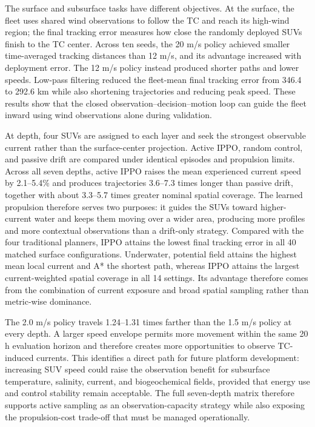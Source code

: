 \documentclass[a4paper,fleqn]{cas-dc}
\begin{document}
The surface and subsurface tasks have different objectives. At the surface, the
fleet uses shared wind observations to follow the TC and reach its high-wind
region; the final tracking error measures how close the randomly deployed SUVs
finish to the TC center. Across ten seeds, the 20 m/s policy achieved smaller
time-averaged tracking distances than 12 m/s, and its advantage increased with
deployment error. The 12 m/s
policy instead produced shorter paths and lower speeds. Low-pass filtering
reduced the fleet-mean final tracking error from 346.4 to 292.6 km while also
shortening trajectories and reducing peak speed. These results show that the
closed observation--decision--motion loop can guide the fleet inward using wind
observations alone during validation.

At depth, four SUVs are assigned to each layer and seek the strongest observable
current rather than the surface-center projection. Active IPPO, random control,
and passive drift are compared under identical episodes and propulsion limits.
Across all seven depths, active IPPO raises the mean experienced current
speed by 2.1--5.4\% and produces trajectories 3.6--7.3 times longer than passive
drift, together with about 3.3--5.7 times greater nominal spatial coverage. The
learned
propulsion therefore serves two purposes: it guides the SUVs toward
higher-current water and keeps them moving over a wider area, producing more
profiles and more contextual observations than a drift-only strategy.
Compared with the four traditional planners, IPPO attains the lowest final
tracking error in all 40 matched surface configurations. Underwater, potential
field attains the highest mean local current and A* the shortest path, whereas
IPPO attains the largest current-weighted spatial coverage in all 14 settings.
Its advantage therefore comes from the combination of current exposure and
broad spatial sampling rather than metric-wise dominance.

The 2.0 m/s policy travels 1.24--1.31 times farther than the 1.5 m/s policy at
every depth. A larger speed envelope permits more movement within the same 20 h
evaluation horizon and therefore creates more opportunities to observe
TC-induced currents. This identifies a direct path for future platform development:
increasing SUV speed could raise the observation benefit for subsurface
temperature, salinity, current, and biogeochemical fields, provided that energy
use and control stability remain acceptable. The full seven-depth matrix
therefore supports active sampling as an observation-capacity strategy while
also exposing the propulsion-cost trade-off that must be managed operationally.
\end{document}
